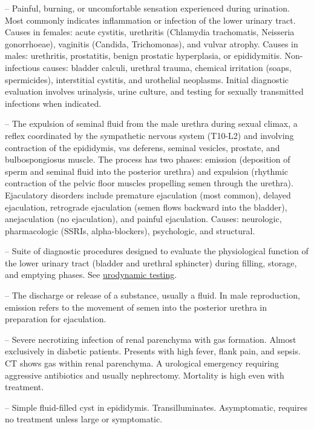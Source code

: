 -- Painful, burning, or uncomfortable sensation experienced during urination. Most commonly indicates inflammation or infection of the lower urinary tract. Causes in females: acute cystitis, urethritis (Chlamydia trachomatis, Neisseria gonorrhoeae), vaginitis (Candida, Trichomonas), and vulvar atrophy. Causes in males: urethritis, prostatitis, benign prostatic hyperplasia, or epididymitis. Non-infectious causes: bladder calculi, urethral trauma, chemical irritation (soaps, spermicides), interstitial cystitis, and urothelial neoplasms. Initial diagnostic evaluation involves urinalysis, urine culture, and testing for sexually transmitted infections when indicated.

-- The expulsion of seminal fluid from the male urethra during sexual climax, a reflex coordinated by the sympathetic nervous system (T10-L2) and involving contraction of the epididymis, vas deferens, seminal vesicles, prostate, and bulbospongiosus muscle. The process has two phases: emission (deposition of sperm and seminal fluid into the posterior urethra) and expulsion (rhythmic contraction of the pelvic floor muscles propelling semen through the urethra). Ejaculatory disorders include premature ejaculation (most common), delayed ejaculation, retrograde ejaculation (semen flows backward into the bladder), anejaculation (no ejaculation), and painful ejaculation. Causes: neurologic, pharmacologic (SSRIs, alpha-blockers), psychologic, and structural.


-- Suite of diagnostic procedures designed to evaluate the physiological function of the lower urinary tract (bladder and urethral sphincter) during filling, storage, and emptying phases. See \hyperlink{Urodynamic Testing}{urodynamic testing}.

-- The discharge or release of a substance, usually a fluid. In male reproduction, emission refers to the movement of semen into the posterior urethra in preparation for ejaculation.

-- Severe necrotizing infection of renal parenchyma with gas formation. Almost exclusively in diabetic patients. Presents with high fever, flank pain, and sepsis. CT shows gas within renal parenchyma. A urological emergency requiring aggressive antibiotics and usually nephrectomy. Mortality is high even with treatment.

-- Simple fluid-filled cyst in epididymis. Transilluminates. Asymptomatic, requires no treatment unless large or symptomatic.

